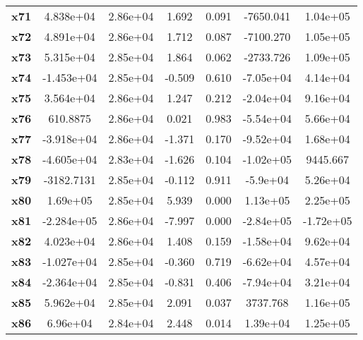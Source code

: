 \documentclass{article}
\begin{document}
\begin{center}
{\begin{tabular}{lcccccc}
\textbf{x71}   &    4.838e+04  &     2.86e+04     &     1.692  &         0.091        &    -7650.041    &     1.04e+05     \\
\textbf{x72}   &    4.891e+04  &     2.86e+04     &     1.712  &         0.087        &    -7100.270    &     1.05e+05     \\
\textbf{x73}   &    5.315e+04  &     2.85e+04     &     1.864  &         0.062        &    -2733.726    &     1.09e+05     \\
\textbf{x74}   &   -1.453e+04  &     2.85e+04     &    -0.509  &         0.610        &    -7.05e+04    &     4.14e+04     \\
\textbf{x75}   &    3.564e+04  &     2.86e+04     &     1.247  &         0.212        &    -2.04e+04    &     9.16e+04     \\
\textbf{x76}   &     610.8875  &     2.86e+04     &     0.021  &         0.983        &    -5.54e+04    &     5.66e+04     \\
\textbf{x77}   &   -3.918e+04  &     2.86e+04     &    -1.371  &         0.170        &    -9.52e+04    &     1.68e+04     \\
\textbf{x78}   &   -4.605e+04  &     2.83e+04     &    -1.626  &         0.104        &    -1.02e+05    &     9445.667     \\
\textbf{x79}   &   -3182.7131  &     2.85e+04     &    -0.112  &         0.911        &     -5.9e+04    &     5.26e+04     \\
\textbf{x80}   &     1.69e+05  &     2.85e+04     &     5.939  &         0.000        &     1.13e+05    &     2.25e+05     \\
\textbf{x81}   &   -2.284e+05  &     2.86e+04     &    -7.997  &         0.000        &    -2.84e+05    &    -1.72e+05     \\
\textbf{x82}   &    4.023e+04  &     2.86e+04     &     1.408  &         0.159        &    -1.58e+04    &     9.62e+04     \\
\textbf{x83}   &   -1.027e+04  &     2.85e+04     &    -0.360  &         0.719        &    -6.62e+04    &     4.57e+04     \\
\textbf{x84}   &   -2.364e+04  &     2.85e+04     &    -0.831  &         0.406        &    -7.94e+04    &     3.21e+04     \\
\textbf{x85}   &    5.962e+04  &     2.85e+04     &     2.091  &         0.037        &     3737.768    &     1.16e+05     \\
\textbf{x86}   &     6.96e+04  &     2.84e+04     &     2.448  &         0.014        &     1.39e+04    &     1.25e+05     \\

\end{tabular}}
\end{center}
\end{document}
